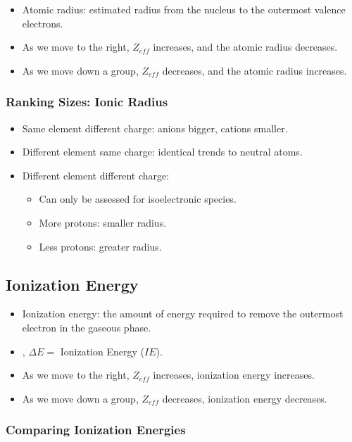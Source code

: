 \documentclass{article}
\begin{document}
\begin{itemize}
    \item Atomic radius: estimated radius from the nucleus to the outermost valence electrons.
    \item As we move to the right, $Z_{eff}$ increases, and the atomic radius decreases. 
    \item As we move down a group, $Z_{eff}$ decreases, and the atomic radius increases.
\end{itemize}

\subsubsection{Ranking Sizes: Ionic Radius}

\begin{itemize}
    \item Same element different charge: anions bigger, cations smaller.
    \item Different element same charge: identical trends to neutral atoms.
    \item Different element different charge:
    \begin{itemize}
        \item Can only be assessed for isoelectronic species.
        \item More protons: smaller radius.
        \item Less protons: greater radius.
    \end{itemize}
\end{itemize}

\subsection{Ionization Energy}

\begin{itemize}
    \item Ionization energy: the amount of energy required to remove the outermost electron in the gaseous phase.
    \item {}, $\Delta E =$ Ionization Energy ($IE$).
    \item As we move to the right, $Z_{eff}$ increases, ionization energy increases.
    \item As we move down a group, $Z_{eff}$ decreases, ionization energy decreases. 
\end{itemize}

\subsubsection{Comparing Ionization Energies}
\end{document}
